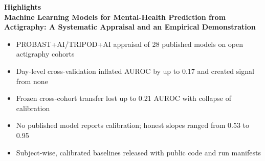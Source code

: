 \documentclass[11pt,a4paper]{article}
\begin{document}
{\large\bfseries Highlights}\\[0.8em]
\textbf{Machine Learning Models for Mental-Health Prediction from Actigraphy: A Systematic Appraisal and an Empirical Demonstration}\\[1em]
\begin{itemize}[leftmargin=1.4em,itemsep=0.5em]
\item PROBAST+AI/TRIPOD+AI appraisal of 28 published models on open actigraphy cohorts
\item Day-level cross-validation inflated AUROC by up to 0.17 and created signal from none
\item Frozen cross-cohort transfer lost up to 0.21 AUROC with collapse of calibration
\item No published model reports calibration; honest slopes ranged from 0.53 to 0.95
\item Subject-wise, calibrated baselines released with public code and run manifests
\end{itemize}
\end{document}
